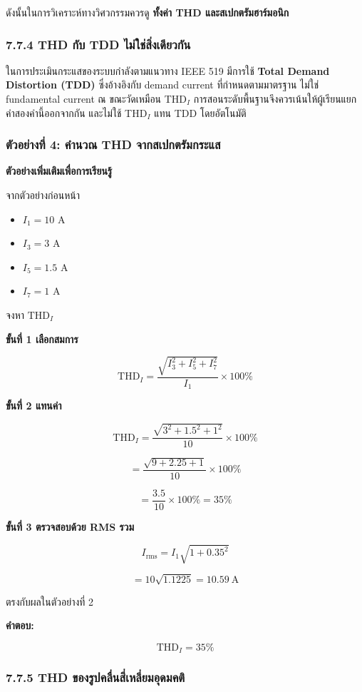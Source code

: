 ดังนั้นในการวิเคราะห์ทางวิศวกรรมควรดู \textbf{ทั้งค่า THD และสเปกตรัมฮาร์มอนิก}

\subsubsection{7.7.4 THD กับ TDD ไม่ใช่สิ่งเดียวกัน}

ในการประเมินกระแสของระบบกำลังตามแนวทาง IEEE 519 มีการใช้ \textbf{Total Demand Distortion (TDD)} ซึ่งอ้างอิงกับ demand current ที่กำหนดตามมาตรฐาน ไม่ใช่ fundamental current ณ ขณะวัดเหมือน THD$_I$ การสอนระดับพื้นฐานจึงควรเน้นให้ผู้เรียนแยกคำสองคำนี้ออกจากกัน และไม่ใช้ THD$_I$ แทน TDD โดยอัตโนมัติ

\subsubsection{ตัวอย่างที่ 4: คำนวณ THD จากสเปกตรัมกระแส}

\textbf{ตัวอย่างเพิ่มเติมเพื่อการเรียนรู้}

จากตัวอย่างก่อนหน้า

\begin{itemize}
    \item $I_1=10$ A
    \item $I_3=3$ A
    \item $I_5=1.5$ A
    \item $I_7=1$ A
\end{itemize}

จงหา $\mathrm{THD}_I$

\textbf{ขั้นที่ 1 เลือกสมการ}

\[
\mathrm{THD}_I=\frac{\sqrt{I_3^2+I_5^2+I_7^2}}{I_1}\times100\%
\]

\textbf{ขั้นที่ 2 แทนค่า}

\[
\mathrm{THD}_I=\frac{\sqrt{3^2+1.5^2+1^2}}{10}\times100\%
\]

\[
=\frac{\sqrt{9+2.25+1}}{10}\times100\%
\]

\[
=\frac{3.5}{10}\times100\%=35\%
\]

\textbf{ขั้นที่ 3 ตรวจสอบด้วย RMS รวม}

\[
I_{\mathrm{rms}}=I_1\sqrt{1+0.35^2}
\]

\[
=10\sqrt{1.1225}=10.59\ \text{A}
\]

ตรงกับผลในตัวอย่างที่ 2

\textbf{คำตอบ:}

\[
\boxed{\mathrm{THD}_I=35\%}
\]

\subsubsection{7.7.5 THD ของรูปคลื่นสี่เหลี่ยมอุดมคติ}


